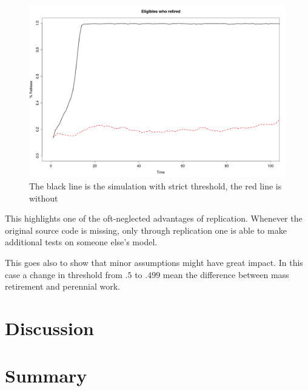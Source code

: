 \documentclass[runningheads,a4paper]{llncs}
\begin{document}
\begin{figure}
 \begin{center}
  \includegraphics[scale=.30]{figs/laxstrict.png}
\caption{The black line is the simulation with strict threshold, the red line is without}
\label{laxstrict}
 \end{center}
\end{figure}

This highlights one of the oft-neglected advantages of replication.
Whenever the original source code is missing, only through replication one is able to make additional tests on someone else's model.

This goes also to show that minor assumptions might have great impact.
In this case a change in threshold from $.5$ to $.499$ mean the difference between mass retirement and perennial work.






\section{Discussion}
\section{Summary}



\end{document}
